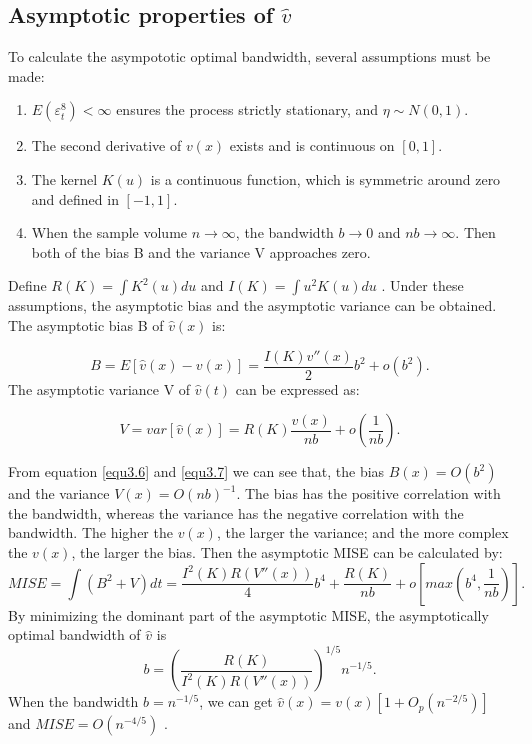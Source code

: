 \subsection{ Asymptotic properties of $\hat{v}$}
To calculate the asympototic optimal bandwidth, several assumptions must be made:
 \begin{enumerate}
  \item $E(\varepsilon_{t}^{8})<\infty$ ensures the process strictly stationary, and $\eta \sim N(0,1)$\citep{Ling2002}.
  \item The second derivative of $v(x)$ exists and is continuous on $[0,1]$.
  \item The kernel $K(u)$ is a continuous function, which is symmetric around zero and defined in $[-1, 1]$.
  
  \item When the sample volume $n \rightarrow \infty $, the bandwidth $b \rightarrow 0 $ and $nb \rightarrow \infty $. Then both of the bias B and the variance V approaches zero.
 
\end{enumerate}
Define $R(K)= \int K^{2}(u)du$ and $I(K)=\int u^{2}K(u)du$ . Under these assumptions, the asymptotic bias and the asymptotic variance can be obtained.
The asymptotic bias B of $\hat{v}(x)$ is:

\begin{equation}
\label{equ3.6}
B=E[\hat{v}(x)-v(x)] = \frac{I(K)v''(x)}{2}b^{2}+o(b^{2}).
\end{equation}
The asymptotic variance V of $\hat{v}(t)$ can be expressed as:

\begin{equation}
\label{equ3.7}
V=var[\hat{v}(x)]=R(K)\frac{v(x)}{nb}+o(\frac{1}{nb}).
\end{equation}  

From equation \ref{equ3.6} and \ref{equ3.7} we can see that, the bias $B(x)=O(b^2)$ and the variance $V(x)=O(nb)^{-1}$. The bias has the positive correlation with the bandwidth, whereas the variance has the negative correlation with the bandwidth. The higher the $v(x)$, the larger the variance; and the more complex the $v(x)$, the larger the bias.
Then the asymptotic MISE can be calculated by:
\begin{equation}
MISE = \int(B^{2}+V)dt=\frac{I^{2}(K)R(V''(x))}{4}b^{4} + \frac{R(K)}{nb} + o[max(b^{4},\frac{1}{nb})].
\end{equation}
By minimizing the dominant part of the asymptotic MISE, the asymptotically optimal bandwidth of $\hat{v}$ is
\begin{equation}
b=(\frac{R(K)}{I^{2}(K)R(V''(x))})^{1/5}n^{-1/5}.
\end{equation}
When the bandwidth $b=n^{-1/5}$, we can get $\hat{v}(x)=v(x)[1+O_{p}(n^{-2/5})]$ and $MISE=O(n^{-4/5})$ \citep{Gasser1984,Fan1991}.

